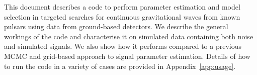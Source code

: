 This document describes a code to perform parameter estimation and model selection in targeted
searches for continuous gravitational waves from known pulsars using data from ground-based \gw detectors.
We describe the general workings of the code and characterise it on simulated data containing both noise and
simulated signals. We also show how it performs compared to a previous MCMC and grid-based
approach to signal parameter estimation. Details of how to run the code in a variety of
cases are provided in Appendix~\ref{app:usage}.
